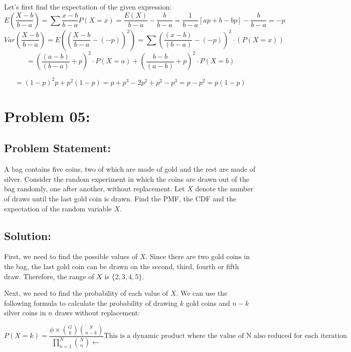\documentclass{article}
\theoremstyle{definition}
\begin{document}
Let's first find the expectation of the given expression:\\

\[
E(\frac{X-b}{b-a}) = \sum \frac{x-b}{b-a}P(X=x) = \frac{E(X)}{b-a} - \frac{b}{b-a} = \frac{1}{b-a} [ap + b - bp] - \frac{b}{b-a} = -p
\]
\[
Var(\frac{X-b}{b-a}) = E((\frac{X-b}{b-a}- (-p))^2)  = \sum (\frac{(x-b)}{(b-a)}-(-p))^2 \cdot (P(X=x)) 
\]
 \[
  = (\frac{(a-b)}{(b-a)}+p )^2 \cdot P(X=a) + (\frac{b-b}{(a-b)}+p)^2 \cdot P(X=b) 

 \]

\[
= (1-p)^2 p + p^2 (1-p) = p + p^3 - 2p^2 + p^2 -p^3 = p - p^2 = p (1-p)
\]


\section{Problem 05:}
\begin{mdframed}[style = MyFrame]
\subsection{Problem Statement:}

A bag contains five coins, two of which are made of gold and the rest are made of silver. Consider the random experiment in which the coins are drawn out of the bag randomly, one after another, without replacement. Let $X$ denote the number of draws until the last gold coin is drawn. Find the PMF, the CDF and the expectation of the random variable $X$.


\end{mdframed}
\subsection{Solution:}


First, we need to find the possible values of $X$. Since there are two gold coins in the bag, the last gold coin can be drawn on the second, third, fourth or fifth draw. Therefore, the range of $X$ is $\{2, 3, 4, 5\}$.

Next, we need to find the probability of each value of $X$. We can use the following formula to calculate the probability of drawing $k$ gold coins and $n-k$ silver coins in $n$ draws without replacement:

$$P(X = k) = \frac{\phi \times \binom{G}{k} \binom{S}{n-k}}{\prod_{n=1}^N \binom{N}{n} \xleftarrow{} } \text{This is a dynamic product where the value of N also reduced for each iteration}$$
\end{document}
